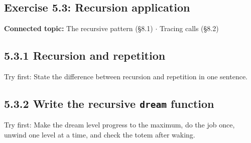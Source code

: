\documentclass[11pt]{article}
\begin{document}
\begin{keepsection}
\section{Exercise 5.3: Recursion application}

\textbf{Connected topic:} The recursive pattern (§8.1) \ensuremath{\cdot} Tracing calls (§8.2)

\begin{keepsection}
\subsection{5.3.1 Recursion and repetition}

Try first: State the difference between recursion and repetition in one sentence.

\end{keepsection}

\begin{keepsection}
\subsection{5.3.2 Write the recursive \texttt{dream} function}

Try first: Make the dream level progress to the maximum, do the job once, unwind one level at a time, and check the totem after waking.

\end{keepsection}
\end{keepsection}


\clearpage
\end{document}
